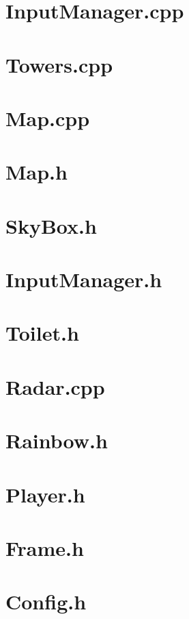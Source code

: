 \section{InputManager.cpp}

\pagebreak
\section{Towers.cpp}

\pagebreak
\section{Map.cpp}

\pagebreak
\section{Map.h}

\pagebreak
\section{SkyBox.h}

\pagebreak
\section{InputManager.h}

\pagebreak
\section{Toilet.h}

\pagebreak
\section{Radar.cpp}

\pagebreak
\section{Rainbow.h}

\pagebreak
\section{Player.h}

\pagebreak
\section{Frame.h}

\pagebreak
\section{Config.h}

\pagebreak
